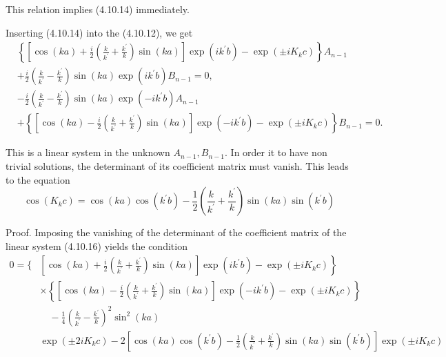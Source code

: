 \documentclass{article}
\begin{document}
This relation implies (4.10.14) immediately.

Inserting (4.10.14) into the (4.10.12), we get
$$
\begin{align*}
& \left\{\left[\cos (k a)+\frac{i}{2}\left(\frac{k}{k^{\prime}}+\frac{k^{\prime}}{k}\right) \sin (k a)\right] \exp \left(i k^{\prime} b\right)-\exp \left( \pm i K_{k} c\right)\right\} A_{n-1}  \tag{4.10.16a}\\
& +\frac{i}{2}\left(\frac{k}{k^{\prime}}-\frac{k^{\prime}}{k}\right) \sin (k a) \exp \left(i k^{\prime} b\right) B_{n-1}=0, \\
& -\frac{i}{2}\left(\frac{k}{k^{\prime}}-\frac{k^{\prime}}{k}\right) \sin (k a) \exp \left(-i k^{\prime} b\right) A_{n-1}  \tag{4.10.16b}\\
& +\left\{\left[\cos (k a)-\frac{i}{2}\left(\frac{k}{k^{\prime}}+\frac{k^{\prime}}{k}\right) \sin (k a)\right] \exp \left(-i k^{\prime} b\right)-\exp \left( \pm i K_{k} c\right)\right\} B_{n-1}=0 .
\end{align*}
$$

This is a linear system in the unknown $A_{n-1}, B_{n-1}$. In order it to have non trivial solutions, the determinant of its coefficient matrix must vanish. This leads to the equation
$$
\begin{equation*}
\cos \left(K_{k} c\right)=\cos (k a) \cos \left(k^{\prime} b\right)-\frac{1}{2}\left(\frac{k}{k^{\prime}}+\frac{k^{\prime}}{k}\right) \sin (k a) \sin \left(k^{\prime} b\right) \tag{4.10.17}
\end{equation*}
$$

Proof. Imposing the vanishing of the determinant of the coefficient matrix of the linear system (4.10.16) yields the condition
$$
\begin{align*}
0=\{ & {\left.\left[\cos (k a)+\frac{i}{2}\left(\frac{k}{k^{\prime}}+\frac{k^{\prime}}{k}\right) \sin (k a)\right] \exp \left(i k^{\prime} b\right)-\exp \left( \pm i K_{k} c\right)\right\} }  \tag{4.10.18}\\
& \times\left\{\left[\cos (k a)-\frac{i}{2}\left(\frac{k}{k^{\prime}}+\frac{k^{\prime}}{k}\right) \sin (k a)\right] \exp \left(-i k^{\prime} b\right)-\exp \left( \pm i K_{k} c\right)\right\} \\
& \quad-\frac{1}{4}\left(\frac{k}{k^{\prime}}-\frac{k^{\prime}}{k}\right)^{2} \sin ^{2}(k a) \\
& \exp \left( \pm 2 i K_{k} c\right)-2\left[\cos (k a) \cos \left(k^{\prime} b\right)-\frac{1}{2}\left(\frac{k}{k^{\prime}}+\frac{k^{\prime}}{k}\right) \sin (k a) \sin \left(k^{\prime} b\right)\right] \exp \left( \pm i K_{k} c\right)
\end{align*}
$$
\end{document}
